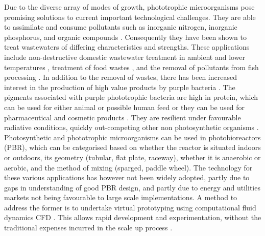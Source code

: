 Due to the diverse array of modes of growth, phototrophic microorganisms pose promising solutions to current important technological challenges. They are able to assimilate and consume pollutants such as inorganic nitrogen, inorganic phosphorus, and organic compounds \cite{hulsen2014}. Consequently they have been shown to treat wastewaters of differing characteristics and strengths. These applications include non-destructive domestic wastewater treatment in ambient and lower temperatures \cite{hulsen2016, hulsen2016a}, treatment of food wastes \cite{chitapornpan2013}, and the removal of pollutants from fish processing \cite{azad2004}. In addition to the removal of wastes, there has been increased interest in the production of high value products by purple bacteria \cite{zhou2015}.  The pigments associated with purple phototrophic bacteria are high in protein, which can be used for either animal or possible human feed \cite{matassa2015,hulsen2018a} or they can be used for pharmaceutical and cosmetic products \cite{aksu2005}. They are resilient under favourable radiative conditions, quickly out-competing other non photosynthetic organisms \cite{posten2009}. Photosynthetic and phototrophic microorganisms can be used in photobioreactors (PBR), which can be categorised based on whether the reactor is situated indoors or outdoors, its geometry (tubular, flat plate, raceway), whether it is anaerobic or aerobic, and the method of mixing (sparged, paddle wheel). The technology for these various applications has however not been widely adopted, partly due to gaps in understanding of good PBR design, and partly due to energy and utilities markets not being favourable to large scale implementations. A method to address the former is to undertake virtual prototyping using computational fluid dynamics CFD \cite{bitog2011}. This allows rapid development and experimentation, without the traditional expenses incurred in the scale up process \cite{bridgeman2012}.


